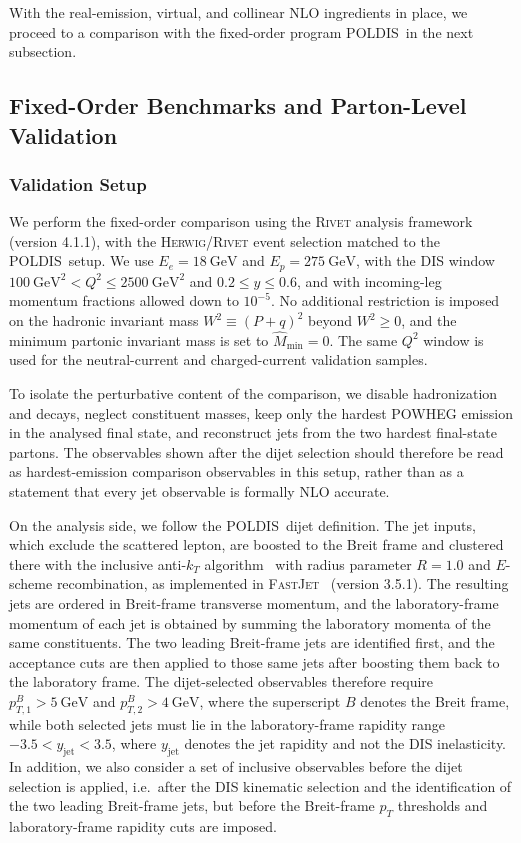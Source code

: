 \documentclass[a4paper,11pt]{article}
\newcommand{\Herwig}{\textsc{Herwig}}
\newcommand{\POLDIS}{\textsc{POLDIS}}
\begin{document}
With the real-emission, virtual, and collinear NLO ingredients in place, we proceed to a comparison with the fixed-order program \POLDIS\ in the next subsection.

\subsection{Fixed-Order Benchmarks and Parton-Level Validation}

\subsubsection{Validation Setup}
We perform the fixed-order comparison using the \textsc{Rivet} analysis framework~\cite{Bierlich:2024vqo} (version 4.1.1), with the \Herwig/\textsc{Rivet} event selection matched to the \POLDIS\ setup. We use $E_e=18~\mathrm{GeV}$ and $E_p=275~\mathrm{GeV}$, with the DIS window
$100~\mathrm{GeV}^2 < Q^2 \le 2500~\mathrm{GeV}^2$ and $0.2 \le y \le 0.6$, and with
incoming-leg momentum fractions allowed down to $10^{-5}$. No additional
restriction is imposed on the hadronic invariant mass $W^2 \equiv (P + q)^2$
beyond $W^2 \ge 0$, and the minimum partonic invariant mass is set to
$\hat{M}_{\mathrm{min}}=0$. The same $Q^2$ window is used for the
neutral-current and charged-current validation samples.

To isolate the perturbative content of the comparison, we disable hadronization
and decays, neglect constituent masses, keep only the hardest POWHEG emission in
the analysed final state, and reconstruct jets from the two hardest final-state
partons. The observables shown after the dijet selection should therefore be
read as hardest-emission comparison observables in this setup, rather than as a
statement that every jet observable is formally NLO accurate.

On the analysis side, we follow the \POLDIS\ dijet definition. The jet inputs,
which exclude the scattered lepton, are boosted to the Breit frame and
clustered there with the inclusive anti-$k_T$ algorithm~\cite{Cacciari:2008gp}
with radius parameter $R=1.0$ and $E$-scheme recombination, as implemented in
\textsc{FastJet}~\cite{Cacciari:2011ma} (version 3.5.1). The resulting jets are ordered in
Breit-frame transverse momentum, and the laboratory-frame momentum of each jet
is obtained by summing the laboratory momenta of the same constituents. The two
leading Breit-frame jets are identified first, and the acceptance cuts are then
applied to those same jets after boosting them back to the laboratory frame. The
dijet-selected observables therefore require
$p_{T,1}^{B}>5~\mathrm{GeV}$ and
$p_{T,2}^{B}>4~\mathrm{GeV}$, where the superscript $B$ denotes the Breit frame,
while both selected jets must lie in
the laboratory-frame rapidity range $-3.5<y_{\mathrm{jet}}<3.5$, where
$y_{\mathrm{jet}}$ denotes the jet rapidity and not the DIS inelasticity. In addition,
we also consider a set of inclusive observables before the dijet selection is applied, i.e.\ after the DIS
kinematic selection and the identification of the two leading Breit-frame jets,
but before the Breit-frame $p_T$ thresholds and laboratory-frame rapidity cuts
are imposed.
\end{document}
